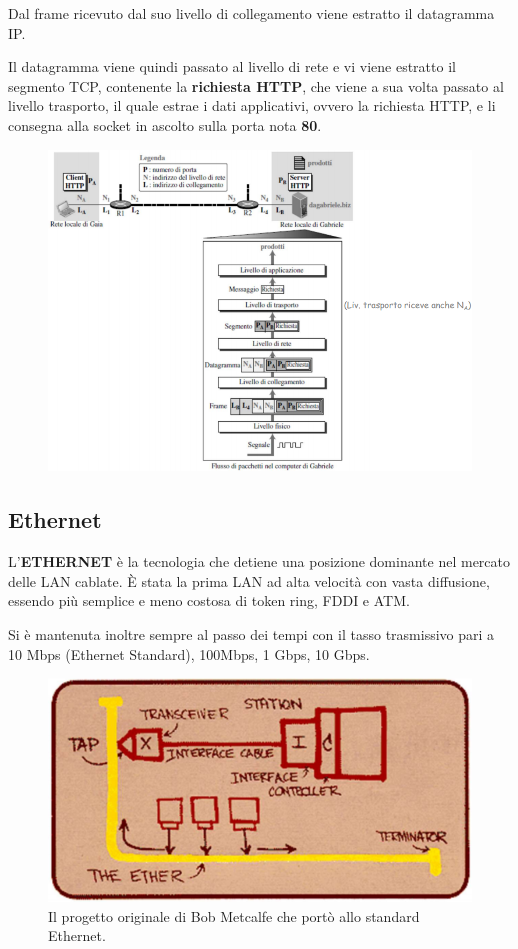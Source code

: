 \documentclass[11pt,a4paper,oneside]{book}
\theoremstyle{definition}
\begin{document}
Dal frame ricevuto dal suo livello di collegamento viene estratto il datagramma IP.

Il datagramma viene quindi passato al livello di rete e vi viene estratto il segmento TCP, contenente la \textbf{richiesta HTTP}, che viene a sua volta passato al livello trasporto, il quale estrae i dati applicativi, ovvero la richiesta HTTP, e li consegna alla socket in ascolto sulla porta nota \textbf{80}.

\pagebreak

\begin{figure}[!h]
	\includegraphics[scale=0.53]{Immagini/ARPexample2.png}
	\centering
\end{figure}

\subsection{Ethernet}
L'\textbf{ETHERNET} è la tecnologia che detiene una posizione dominante nel mercato
delle LAN cablate. È stata la prima LAN ad alta velocità con vasta diffusione, essendo più semplice e meno costosa di token ring, FDDI e ATM.

Si è mantenuta inoltre sempre al passo dei tempi con il tasso trasmissivo pari a 10 Mbps (Ethernet Standard), 100Mbps, 1 Gbps, 10 Gbps.

\begin{figure}[!h]
	\includegraphics[scale=0.3]{Immagini/Original.png}
	\centering
	\caption{Il progetto originale di Bob Metcalfe che portò allo standard Ethernet.}
\end{figure}
\end{document}
